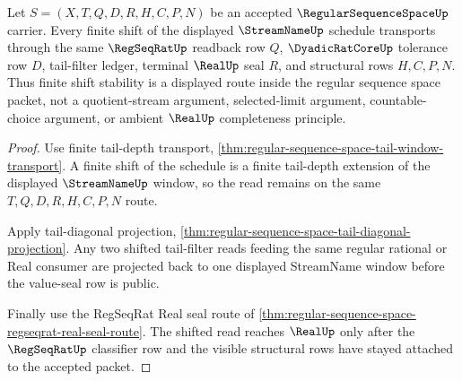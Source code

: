 \begin{theorem}\label{thm:regular-sequence-space-shift-stability}
Let $S=(X,T,Q,D,R,H,C,P,N)$ be an accepted $\RegularSequenceSpaceUp$ carrier. Every finite shift of the displayed $\StreamNameUp$ schedule transports through the same $\RegSeqRatUp$ readback row $Q$, $\DyadicRatCoreUp$ tolerance row $D$, tail-filter ledger, terminal $\RealUp$ seal $R$, and structural rows $H,C,P,N$. Thus finite shift stability is a displayed route inside the regular sequence space packet, not a quotient-stream argument, selected-limit argument, countable-choice argument, or ambient $\RealUp$ completeness principle.
\end{theorem}
\begin{proof}
Use finite tail-depth transport, \autoref{thm:regular-sequence-space-tail-window-transport}. A finite shift of the schedule is a finite tail-depth extension of the displayed $\StreamNameUp$ window, so the read remains on the same $T,Q,D,R,H,C,P,N$ route.

Apply tail-diagonal projection, \autoref{thm:regular-sequence-space-tail-diagonal-projection}. Any two shifted tail-filter reads feeding the same regular rational or Real consumer are projected back to one displayed StreamName window before the value-seal row is public.

Finally use the RegSeqRat Real seal route of \autoref{thm:regular-sequence-space-regseqrat-real-seal-route}. The shifted read reaches $\RealUp$ only after the $\RegSeqRatUp$ classifier row and the visible structural rows have stayed attached to the accepted packet.
\end{proof}
